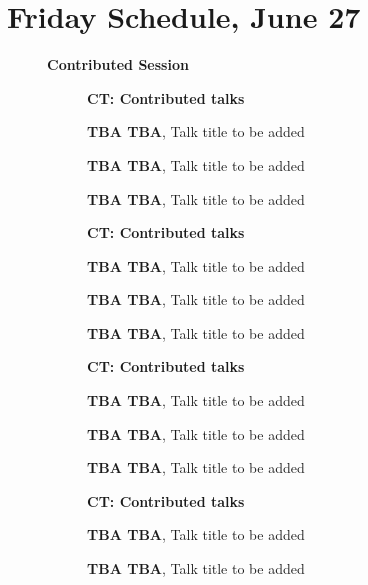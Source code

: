 \documentclass[ILAS2025-program.tex]{subfiles}
\begin{document}
\section{Friday Schedule, June 27}
    
    \begin{description}
    \item[] \textbf{Contributed Session} 
    \begin{description}
    \item[] \textbf{CT: Contributed talks} 
    \item[] \textbf{TBA TBA}, Talk title to be added
        \item[] \textbf{TBA TBA}, Talk title to be added
        \item[] \textbf{TBA TBA}, Talk title to be added
        \end{description}
    \begin{description}
    \item[] \textbf{CT: Contributed talks} 
    \item[] \textbf{TBA TBA}, Talk title to be added
        \item[] \textbf{TBA TBA}, Talk title to be added
        \item[] \textbf{TBA TBA}, Talk title to be added
        \end{description}
    \begin{description}
    \item[] \textbf{CT: Contributed talks} 
    \item[] \textbf{TBA TBA}, Talk title to be added
        \item[] \textbf{TBA TBA}, Talk title to be added
        \item[] \textbf{TBA TBA}, Talk title to be added
        \end{description}
    \begin{description}
    \item[] \textbf{CT: Contributed talks} 
    \item[] \textbf{TBA TBA}, Talk title to be added
        \item[] \textbf{TBA TBA}, Talk title to be added

\end{description}
\end{description}
\end{document}

